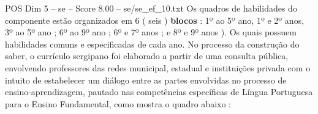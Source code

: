 \begin{textsample}{POS Dim 5 – se – Score 8.00 – se/se\_ef\_10.txt}
Os quadros de habilidades do componente estão organizados em 6 ( seis ) \textbf{blocos} : 1º ao 5º ano, 1º e 2º anos, 3º ao 5º ano ; 6º ao 9º ano ; 6º e 7º anos ; e 8º e 9º anos ).
Os quais possuem habilidades comuns e especificadas de cada ano.
No processo da construção do saber, o currículo sergipano foi elaborado a partir de uma consulta pública, envolvendo professores das redes municipal, estadual e instituições privada com o intuito de estabelecer um diálogo entre as partes envolvidas no processo de ensino-aprendizagem, pautado nas competências específicas de Língua Portuguesa para o Ensino Fundamental, como mostra o quadro abaixo :

\end{textsample}
